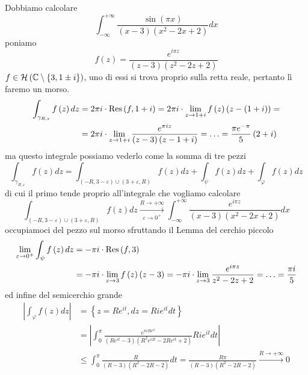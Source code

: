 Dobbiamo calcolare
\begin{equation*}
\int ^{ + \infty }_{ - \infty }\frac{\sin\left(\pi x\right)}{\left(x - 3\right)\left(x^{2} - 2x + 2\right)} dx
\end{equation*}
poniamo
\begin{equation*}
f\left(z\right) = \frac{e^{i\pi z}}{\left(z - 3\right)\left(z^{2} - 2z + 2\right)}
\end{equation*}
$f\in \mathcal{H} \left(\mathbb{C}  \setminus \left\{3,1\pm i\right\}\right)$, uno di essi si trova proprio sulla retta reale, pertanto lì faremo un morso.
\begin{align*}
\int _{\gamma _{R,\varepsilon }} f\left(z\right) dz & = 2\pi i\cdot \operatorname{Res} \left(f,1 + i\right) = 2\pi i\cdot \lim _{z\rightarrow 1 + i} f\left(z\right)\left(z - \left(1 + i\right)\right) = \\
 & = 2\pi i\cdot \lim _{z\rightarrow 1 + i}\frac{e^{\pi iz}}{\left(z - 3\right)\left(z - 1 + i\right)} = \dotsc = \frac{\pi e^{ - \pi }}{5}\left(2 + i\right)
\end{align*}
ma questo integrale possiamo vederlo come la somma di tre pezzi
\begin{equation*}
\int _{\gamma _{R,\varepsilon }} f\left(z\right) dz = \int _{\left(- R,3 - \varepsilon \right) \cup \left(3 + \varepsilon ,R\right)} f\left(z\right) dz + \int _{\psi } f\left(z\right) dz + \int _{\varphi } f\left(z\right) dz
\end{equation*}
di cui il primo tende proprio all'integrale che vogliamo calcolare
\begin{equation*}
\int _{\left(- R,3 - \varepsilon \right) \cup \left(3 + \varepsilon ,R\right)} f\left(z\right) dz\xrightarrow[\varepsilon \rightarrow 0^{ + }]{R\rightarrow + \infty }\int ^{ + \infty }_{ - \infty }\frac{e^{i\pi z}}{\left(x - 3\right)\left(x^{2} - 2x + 2\right)} dx
\end{equation*}
occupiamoci del pezzo sul morso sfruttando il Lemma del cerchio piccolo
\begin{align*}
\lim _{\varepsilon \rightarrow 0^{ + }}\int _{\psi } f\left(z\right) dz & = - \pi i\cdot \operatorname{Res} \left(f,3\right)\\
 & = - \pi i\cdot \lim _{z\rightarrow 3} f\left(z\right)\left(z - 3\right) = - \pi i\cdot \lim _{z\rightarrow 3}\frac{e^{i\pi z}}{z^{2} - 2z + 2} = \dotsc = \frac{\pi i}{5}
\end{align*}
ed infine del semicerchio grande
\begin{align*}
\left| \int _{\varphi } f\left(z\right) dz\right|  & = \left\{z = Re^{it} ,dz = Rie^{it} dt\right\}\\
 & = \left| \int ^{\pi }_{0}\frac{e^{\pi iRe^{it}}}{\left(Re^{it} - 3\right)\left(R^{2} e^{i2t} - 2Re^{it} + 2\right)} Rie^{it} dt\right| \\
 & \leqslant \int ^{\pi }_{0}\frac{R}{\left(R - 3\right)\left(R^{2} - 2R - 2\right)} dt = \frac{R\pi }{\left(R - 3\right)\left(R^{2} - 2R - 2\right)}\xrightarrow{R\rightarrow + \infty } 0
\end{align*}
